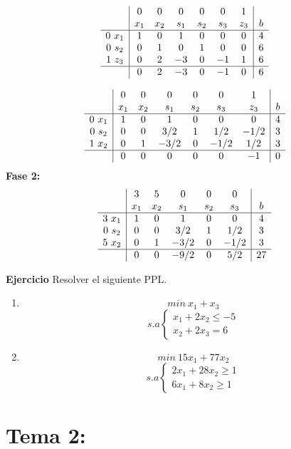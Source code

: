 \documentclass[11pt,fleqn]{book} %
\begin{document}
$$
\begin{array}{c|cccccc|c}
& 0 & 0 & 0 & 0 & 0 & 1 & \\
& x_1 & x_2 & s_1 & s_2 & s_3 & z_3 & b \\ \hline
0 ~ x_1 & 1 & 0 & 1 & 0 & 0 & 0 & 4 \\
0 ~ s_2 & 0 & 1 & 0 & 1 & 0 & 0 & 6 \\
1 ~ z_3 & 0 & 2 & -3 & 0 & -1 & 1 & 6 \\ \hline
& 0 & 2 & -3 & 0 & -1 & 0 & 6
\end{array}
$$

$$
\begin{array}{c|cccccc|c}
& 0 & 0 & 0 & 0 & 0 & 1 & \\
& x_1 & x_2 & s_1 & s_2 & s_3 & z_3 & b \\ \hline
0 ~ x_1 & 1 & 0 & 1 & 0 & 0 & 0 & 4 \\
0 ~ s_2 & 0 & 0 & 3/2 & 1 & 1/2 & -1/2 & 3 \\
1 ~ x_2 & 0 & 1 & -3/2 & 0 & -1/2 & 1/2 & 3 \\ \hline
& 0 & 0 & 0 & 0 & 0 & -1 & 0 
\end{array}
$$
\textbf{Fase 2: }
$$
\begin{array}{c|ccccc|c}
& 3 & 5 & 0 & 0 & 0 & \\
& x_1 & x_2 & s_1 & s_2 & s_3 & b \\ \hline
3 ~ x_1 & 1 & 0 & 1 & 0 & 0 & 4 \\
0 ~ s_2 & 0 & 0 & 3/2 & 1 & 1/2 & 3 \\
5 ~ x_2 & 0 & 1 & -3/2 & 0 & -1/2 & 3 \\ \hline
& 0 & 0 & -9/2 & 0  & 5/2 & 27 
\end{array}
$$

\textbf{Ejercicio} Resolver el siguiente PPL.

\begin{enumerate}
	\item 
	$$min ~x_1 + x_3 $$
	$$s.a \left\{
	\begin{array}{c}
	x_1+2x_2 \leq -5 \\
	x_2 + 2x_3 = 6 
	\end{array}
	\right.
	$$
	\item $$min ~ 15 x_1 + 77 x_2 $$
	$$s.a \left\{
	\begin{array}{c}
	2x_1+28x_2 \geq 1 \\
	6x_1+8x_2 \geq 1
	\end{array}
	\right.
	$$
\end{enumerate}

\part{Tema 2:}
\end{document}
